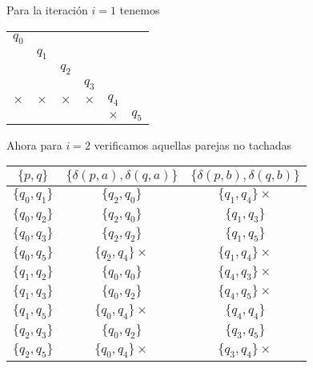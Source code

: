 \begin{itemize}
        Para la iteración $i=1$ tenemos
        \begin{center}
            \begin{tabular}{cccccc}
                $q_0$ \\ \cline{1-1}
                \multicolumn{1}{|c|}{} & $q_1$ \\ \cline{1-2}
                \multicolumn{1}{|c|}{} & \multicolumn{1}{|c|}{} & $q_2$ \\ \cline{1-3}
                \multicolumn{1}{|c|}{} & \multicolumn{1}{|c|}{} & \multicolumn{1}{|c|}{} & $q_3$ \\ \cline{1-4}
                \multicolumn{1}{|c|}{$\times$} & \multicolumn{1}{|c|}{$\times$} & \multicolumn{1}{|c|}{$\times$}& \multicolumn{1}{|c|}{$\times$}& $q_4$ \\ \cline{1-5}
                \multicolumn{1}{|c|}{} & \multicolumn{1}{|c|}{} & \multicolumn{1}{|c|}{} & \multicolumn{1}{|c|}{}& \multicolumn{1}{|c|}{$\times$} & $q_5$ \\ \cline{1-5}
            \end{tabular}
        \end{center}
        Ahora para $i=2$ verificamos aquellas parejas no tachadas
        \begin{center}
                \begin{tabular}{c||c|c}
                  $\{p,q\}$ & $\{\delta(p,a),\delta(q,a)\}$ & $\{\delta(p,b),\delta(q,b)\}$\\ \hline
                  $\{q_0,q_1\}$ & $\{q_2,q_0\}$ & $\{q_1,q_4\}\times$ \\ \hline
                  $\{q_0,q_2\}$ & $\{q_2,q_0\}$ & $\{q_1,q_3\}$ \\ \hline
                  $\{q_0,q_3\}$ & $\{q_2,q_2\}$ & $\{q_1,q_5\}$ \\ \hline
                  $\{q_0,q_5\}$ & $\{q_2,q_4\}\times$ & $\{q_1,q_4\}\times$ \\ \hline
                  $\{q_1,q_2\}$ & $\{q_0,q_0\}$ & $\{q_4,q_3\}\times$ \\ \hline
                  $\{q_1,q_3\}$ & $\{q_0,q_2\}$ & $\{q_4,q_5\}\times$ \\ \hline
                  $\{q_1,q_5\}$ & $\{q_0,q_4\}\times$ & $\{q_4,q_4\}$ \\ \hline
                  $\{q_2,q_3\}$ & $\{q_0,q_2\}$ & $\{q_3,q_5\}$ \\ \hline
                  $\{q_2,q_5\}$ & $\{q_0,q_4\}\times$ & $\{q_3,q_4\}\times$ \\ \hline

\end{tabular}
\end{center}
\end{itemize}
